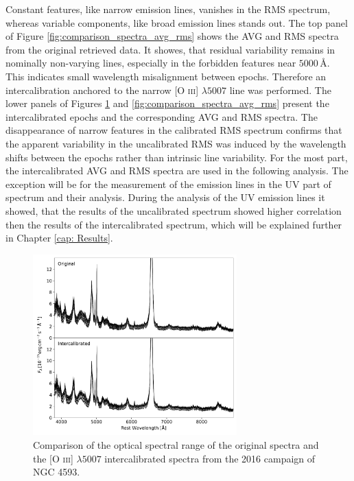 Constant features, like narrow emission lines, vanishes in the RMS spectrum, whereas variable components, like broad emission lines stands out. The top panel of Figure \ref{fig:comparison_spectra_avg_rms} shows the AVG and RMS spectra from the original retrieved data. It showes, that residual variability remains in nominally non-varying lines, especially in the forbidden features near $5000\,\text{\AA}$. This indicates small wavelength misalignment between epochs. Therefore an intercalibration anchored to the narrow [O \textsc{iii}] $\lambda5007$ line was performed. The lower panels of Figures \ref{fig:comparison_spectra} and \ref{fig:comparison_spectra_avg_rms} present the intercalibrated epochs and the corresponding AVG and RMS spectra. The disappearance of narrow features in the calibrated RMS spectrum confirms that the apparent variability in the uncalibrated RMS was induced by the wavelength shifts between the epochs rather than intrinsic line variability. For the most part, the intercalibrated AVG and RMS spectra are used in the following analysis. The exception will be for the measurement of the emission lines in the UV part of spectrum and their analysis. During the analysis of the UV emission lines it showed, that the results of the uncalibrated spectrum showed higher correlation then the results of the intercalibrated spectrum, which will be explained further in Chapter \ref{cap: Results}. 
\newpage
\begin{figure}[!ht]
	\centering
	\includegraphics[width=0.7\textwidth]{pictures/Chapter3/comparison_spectra}
	\caption{Comparison of the optical spectral range of the original spectra and the [O \textsc{iii}] $\lambda5007$ intercalibrated spectra from the 2016 campaign of NGC 4593.}
	\label{fig:comparison_spectra}
\end{figure}




